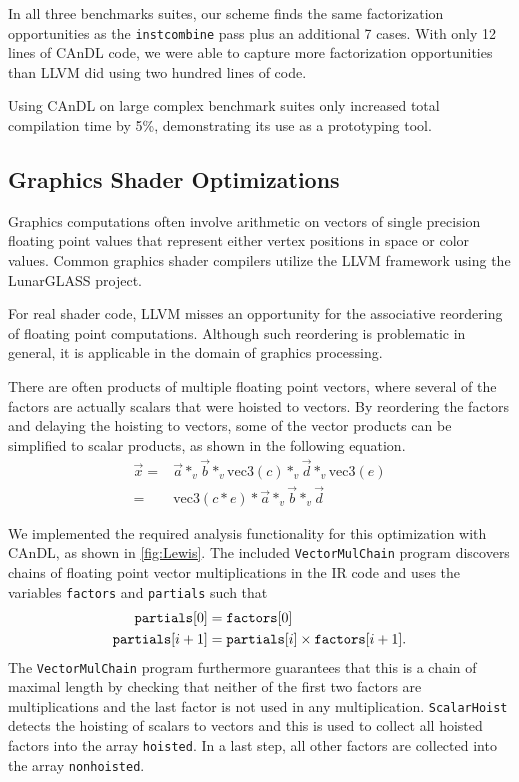     In all three benchmarks suites, our scheme finds the same factorization
    opportunities as the \texttt{instcombine} pass plus an additional 7 cases.
    With only 12 lines of CAnDL code, we were able to capture more factorization
    opportunities than LLVM did using two hundred lines of code.

    Using CAnDL  on large complex benchmark suites only increased total
    compilation time by 5\%, demonstrating its use as a prototyping tool.

\subsection{Graphics Shader Optimizations}

    Graphics computations often involve arithmetic on vectors of single
    precision floating point values that represent either vertex positions in
    space or color values.
    Common graphics shader compilers utilize the LLVM framework using the
    LunarGLASS project.

    For real shader code, LLVM misses an opportunity for the associative
    reordering of floating point computations.
    Although such reordering is problematic in general, it is applicable in the
    domain of graphics processing.

    There are often products of multiple floating point vectors, where several
    of the factors are actually scalars that were hoisted to vectors.
    By reordering the factors and delaying the hoisting to vectors, some of the
    vector products can be simplified to scalar products, as shown in the
    following equation.
    \begin{align*}
        \vec x={}&\vec a*_v\vec b*_v\text{vec3}(c)*_v\vec d*_v\text{vec3}(e)\\
        ={}&\text{vec3}(c*e)*\vec a*_v\vec b*_v\vec d
    \end{align*}

    We implemented the required analysis functionality for this optimization
    with CAnDL, as shown in \autoref{fig:Lewis}.
    The \mbox{included} \texttt{VectorMulChain} program discovers chains of
    floating point vector multiplications in the IR code and uses the variables
    \texttt{factors} and \texttt{partials} such that
    \begin{align*}
        \text{\tt partials}[0] &= \text{\tt factors}[0]\\
        \text{\tt partials}[i+1] &= \text{\tt partials}[i]\times\text{\tt factors}[i+1].
    \end{align*}
    The \texttt{VectorMulChain} program furthermore guarantees that this is a
    chain of maximal length by checking that neither of the first two factors
    are multiplications and the last factor is not used in any multiplication.
    \texttt{ScalarHoist} detects the hoisting of scalars to vectors and this is
    used to collect all hoisted factors into the array \texttt{hoisted}.
    In a last step, all other factors are collected into the array
    \texttt{nonhoisted}.

